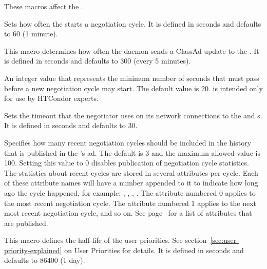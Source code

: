 These macros affect the .
\begin{description}
  
\label{param:NegotiatorInterval}
\item[\Macro{NEGOTIATOR\_INTERVAL}]
  Sets how often the  starts a negotiation cycle.
  It is defined in seconds and defaults to 60 (1 minute).
  
\label{param:NegotiatorUpdateInterval}
\item[\Macro{NEGOTIATOR\_UPDATE\_INTERVAL}]
  This macro determines how often
  the  daemon sends a ClassAd update to the
  .  It is defined in seconds and defaults to 300
  (every 5 minutes).
  
\label{param:NegotiatorCycleDelay}
\item[\Macro{NEGOTIATOR\_CYCLE\_DELAY}]
  An integer value that represents the minimum number of seconds
  that must pass before a new negotiation cycle may start.
  The default value is 20.
   is intended only for use by
  HTCondor experts.

\label{param:NegotiatorTimeout}
\item[\Macro{NEGOTIATOR\_TIMEOUT}]
  Sets the timeout that the negotiator uses on its network connections
  to the  and s.
  It is defined in seconds and defaults to 30.

\label{param:NegotiationCycleStatsLength}
\item[\Macro{NEGOTIATION\_CYCLE\_STATS\_LENGTH}] Specifies how many
  recent negotiation cycles should be included in the history that is
  published in the 's ad.  The default is 3 and the
  maximum allowed value is 100.  Setting this value to 0 disables
  publication of negotiation cycle statistics.  The
  statistics about recent cycles are stored in several attributes per
  cycle.  Each of these attribute names will have a number appended to
  it to indicate how long ago the cycle happened, for example:
  ,
  ,
  , \Dots.  The attribute
  numbered 0 applies to the most recent negotiation cycle.  The
  attribute numbered 1 applies to the next most recent negotiation
  cycle, and so on.  See
  page~\pageref{attr:LastNegotiationCycleActiveSubmitterCount<X>} for a
  list of attributes that are published.

\label{param:PriorityHalfLife}
\item[\Macro{PRIORITY\_HALFLIFE}]
  This macro defines the half-life of the user priorities.  See
  section~\ref{sec:user-priority-explained}
  on User Priorities for details.  It is defined in seconds and defaults
  to 86400 (1 day).


\end{description}
